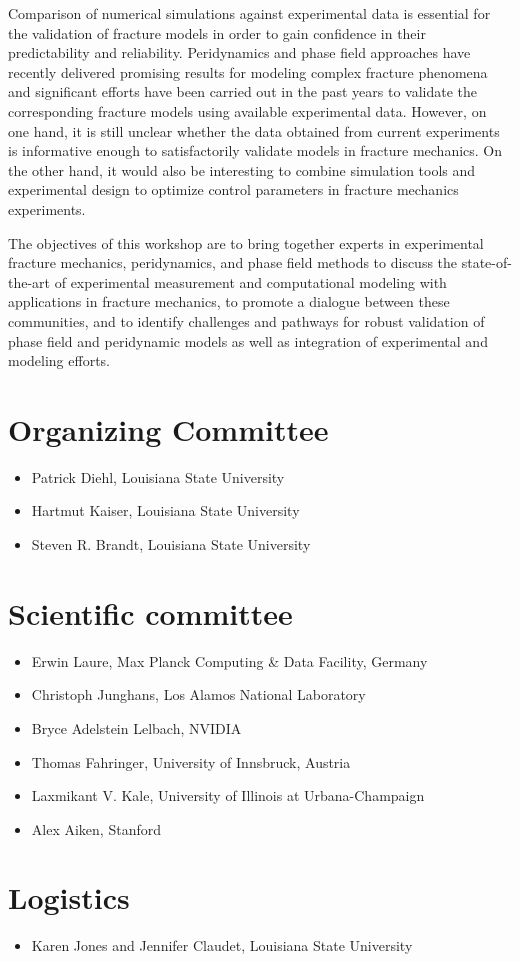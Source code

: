 Comparison of numerical simulations against experimental data is essential
for the validation of fracture models in order to gain confidence in their
predictability and reliability. Peridynamics and phase field approaches have recently
delivered promising results for modeling complex fracture phenomena and significant
efforts have been carried out in the past years to validate the corresponding
fracture models using available experimental data. However, on one hand, it is still
unclear whether the data obtained from current experiments is informative enough to
satisfactorily validate models in fracture mechanics. On the other hand, it would also be
interesting to combine simulation tools and experimental design to optimize
control parameters in fracture mechanics experiments.

The objectives of this workshop are to bring together experts in experimental fracture mechanics,
peridynamics, and phase field methods to discuss the state-of-the-art of experimental
measurement and computational modeling with applications in fracture mechanics, to promote
a dialogue between these communities, and to identify challenges and pathways for robust validation
of phase field and peridynamic models as well as integration of experimental and modeling efforts.

\section*{Organizing Committee}
\begin{itemize}
\item Patrick Diehl, Louisiana State University
\item Hartmut Kaiser, Louisiana State University
\item Steven R. Brandt, Louisiana State University
\end{itemize}

\section*{Scientific committee}
\begin{itemize}
\item Erwin Laure, Max Planck Computing \& Data Facility, Germany
\item Christoph Junghans, Los Alamos National Laboratory
\item Bryce Adelstein Lelbach, NVIDIA
\item Thomas Fahringer, University of Innsbruck, Austria
\item Laxmikant V. Kale,  University of Illinois at Urbana-Champaign
\item Alex Aiken, Stanford
\end{itemize}

\section*{Logistics}
\begin{itemize}
\item Karen Jones and Jennifer Claudet, Louisiana State University
\end{itemize}
